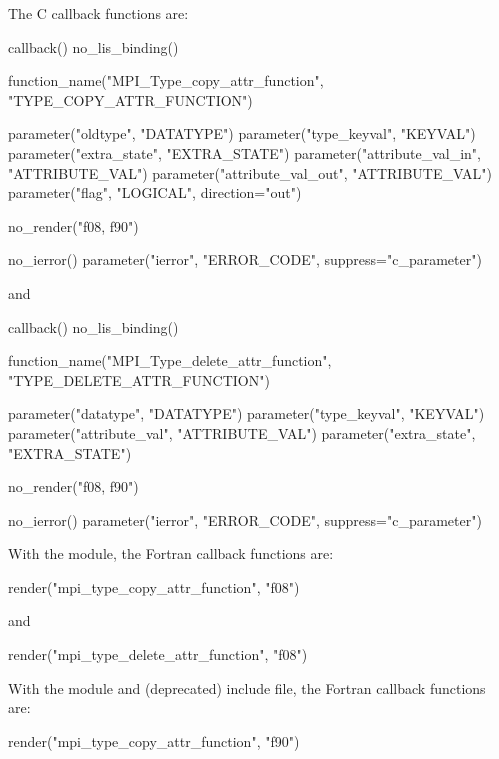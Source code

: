 \noindent
The C callback functions are:

%
\begin{mpi-binding}
    callback()
    no_lis_binding()
    
    function_name("MPI_Type_copy_attr_function", "TYPE_COPY_ATTR_FUNCTION")
    
    parameter("oldtype", "DATATYPE")
    parameter("type_keyval", "KEYVAL")
    parameter("extra_state", "EXTRA_STATE")
    parameter("attribute_val_in", "ATTRIBUTE_VAL")
    parameter("attribute_val_out", "ATTRIBUTE_VAL")
    parameter("flag", "LOGICAL", direction="out")
    
    no_render("f08, f90")
    
    no_ierror()
    parameter("ierror", "ERROR_CODE", suppress="c_parameter")
\end{mpi-binding}

\noindent
and

%
\begin{mpi-binding}
    callback()
    no_lis_binding()
    
    function_name("MPI_Type_delete_attr_function", "TYPE_DELETE_ATTR_FUNCTION")
    
    parameter("datatype", "DATATYPE")
    parameter("type_keyval", "KEYVAL")
    parameter("attribute_val", "ATTRIBUTE_VAL")
    parameter("extra_state", "EXTRA_STATE")
    
    no_render("f08, f90")
    
    no_ierror()
    parameter("ierror", "ERROR_CODE", suppress="c_parameter")
\end{mpi-binding}

\noindent
With the  module, the Fortran callback functions are: 

\begin{mpi-binding}
    render("mpi_type_copy_attr_function", "f08")
\end{mpi-binding}
 
\noindent
and

\begin{mpi-binding}
    render("mpi_type_delete_attr_function", "f08")
\end{mpi-binding}

\noindent
With the  module and (deprecated)  include file, the Fortran callback functions are:

\begin{mpi-binding}
    render("mpi_type_copy_attr_function", "f90")
\end{mpi-binding}

